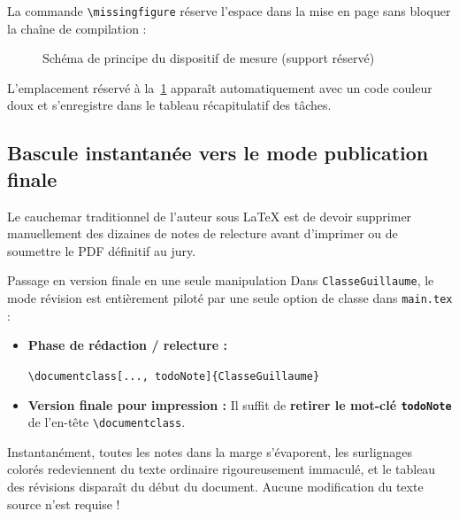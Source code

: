 La commande \texttt{\textbackslash missingfigure} réserve l'espace dans la mise en page sans bloquer la chaîne de compilation :

\begin{figure}[htbp]
  \centering
  \caption{Schéma de principe du dispositif de mesure (support réservé)}
  \label{fig:emplacement_reserve}
\end{figure}

L'emplacement réservé à la~\cref{fig:emplacement_reserve} apparaît automatiquement avec un code couleur doux et s'enregistre dans le tableau récapitulatif des tâches.

\subsection{Bascule instantanée vers le mode publication finale}
\label{subsec:bascule_publication_finale}

Le cauchemar traditionnel de l'auteur sous \LaTeX{} est de devoir supprimer manuellement des dizaines de notes de relecture avant d'imprimer ou de soumettre le PDF définitif au jury.

\begin{boiteSynthese}{Passage en version finale en une seule manipulation}
  Dans \texttt{ClasseGuillaume}, le mode révision est entièrement piloté par une seule option de classe dans \texttt{main.tex} :
  \begin{itemize}
    \item \textbf{Phase de rédaction / relecture :}\par\smallskip\noindent
      \texttt{\textbackslash documentclass[..., todoNote]\{ClasseGuillaume\}}
    \item \textbf{Version finale pour impression :} Il suffit de \textbf{retirer le mot-clé \texttt{todoNote}} de l'en-tête \texttt{\textbackslash documentclass}.
  \end{itemize}
  Instantanément, toutes les notes dans la marge s'évaporent, les surlignages colorés redeviennent du texte ordinaire rigoureusement immaculé, et le tableau des révisions disparaît du début du document. Aucune modification du texte source n'est requise !
\end{boiteSynthese}

